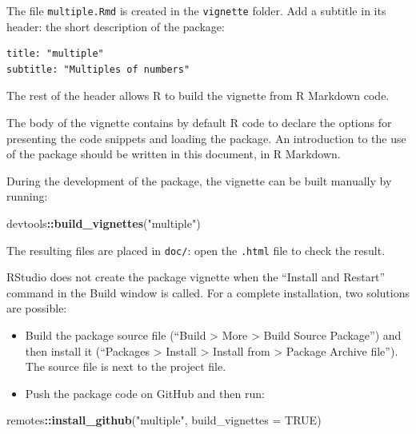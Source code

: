 \documentclass[
  12pt,
  american,
  a4paper,
  extrafontsizes,onecolumn,openright
  ]{memoir}
\newenvironment{Shaded}{\begin{snugshade}}{\end{snugshade}}
\newcommand{\AttributeTok}[1]{\textcolor[rgb]{0.13,0.29,0.53}{#1}}
\newcommand{\ConstantTok}[1]{\textcolor[rgb]{0.56,0.35,0.01}{#1}}
\newcommand{\FunctionTok}[1]{\textcolor[rgb]{0.13,0.29,0.53}{\textbf{#1}}}
\newcommand{\NormalTok}[1]{#1}
\newcommand{\SpecialCharTok}[1]{\textcolor[rgb]{0.81,0.36,0.00}{\textbf{#1}}}
\newcommand{\StringTok}[1]{\textcolor[rgb]{0.31,0.60,0.02}{#1}}
\providecommand{\tightlist}{%
  \setlength{\itemsep}{0pt}\setlength{\parskip}{0pt}}
\begin{document}
\normalsize

The file \texttt{multiple.Rmd} is created in the \texttt{vignette} folder.
Add a subtitle in its header: the short description of the package:

\begin{verbatim}
title: "multiple"
subtitle: "Multiples of numbers"
\end{verbatim}

The rest of the header allows R to build the vignette from R Markdown code.

The body of the vignette contains by default R code to declare the options for presenting the code snippets and loading the package.
An introduction to the use of the package should be written in this document, in R Markdown.

During the development of the package, the vignette can be built manually by running:

\scriptsize

\begin{Shaded}
\begin{Highlighting}[]
\NormalTok{devtools}\SpecialCharTok{::}\FunctionTok{build\_vignettes}\NormalTok{(}\StringTok{"multiple"}\NormalTok{) }
\end{Highlighting}
\end{Shaded}

\normalsize

The resulting files are placed in \texttt{doc/}: open the \texttt{.html} file to check the result.

RStudio does not create the package vignette when the \enquote{Install and Restart} command in the Build window is called.
For a complete installation, two solutions are possible:

\begin{itemize}
\tightlist
\item
  Build the package source file (\enquote{Build \textgreater{} More \textgreater{} Build Source Package}) and then install it (\enquote{Packages \textgreater{} Install \textgreater{} Install from \textgreater{} Package Archive file}).
  The source file is next to the project file.
\item
  Push the package code on GitHub and then run:
\end{itemize}

\scriptsize

\begin{Shaded}
\begin{Highlighting}[]
\NormalTok{remotes}\SpecialCharTok{::}\FunctionTok{install\_github}\NormalTok{(}\StringTok{"multiple"}\NormalTok{, }\AttributeTok{build\_vignettes =} \ConstantTok{TRUE}\NormalTok{)}
\end{Highlighting}
\end{Shaded}
\end{document}
